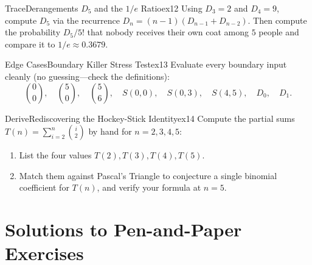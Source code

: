 \documentclass[11pt,a4paper]{article}
\theoremstyle{definition}
\begin{document}
\begin{tryitbox}{Trace}{Derangements $D_5$ and the $1/e$ Ratio}{ex12}
Using $D_3 = 2$ and $D_4 = 9$, compute $D_5$ via the recurrence $D_n = (n - 1)(D_{n-1} + D_{n-2})$. Then compute the probability $D_5 / 5!$ that nobody receives their own coat among $5$ people and compare it to $1/e \approx 0.3679$.
\end{tryitbox}

\begin{tryitbox}{Edge Cases}{Boundary Killer Stress Test}{ex13}
Evaluate every boundary input cleanly (no guessing---check the definitions):
\[
    \binom{0}{0},\quad \binom{5}{0},\quad \binom{5}{6},\quad S(0, 0),\quad S(0, 3),\quad S(4, 5),\quad D_0,\quad D_1.
\]
\end{tryitbox}

\begin{tryitbox}{Derive}{Rediscovering the Hockey-Stick Identity}{ex14}
Compute the partial sums $T(n) = \sum_{i=2}^{n} \binom{i}{2}$ by hand for $n = 2, 3, 4, 5$:
\begin{enumerate}
    \item List the four values $T(2), T(3), T(4), T(5)$.
    \item Match them against Pascal's Triangle to conjecture a single binomial coefficient for $T(n)$, and verify your formula at $n = 5$.
\end{enumerate}
\end{tryitbox}

\section*{Solutions to Pen-and-Paper Exercises}
\end{document}
